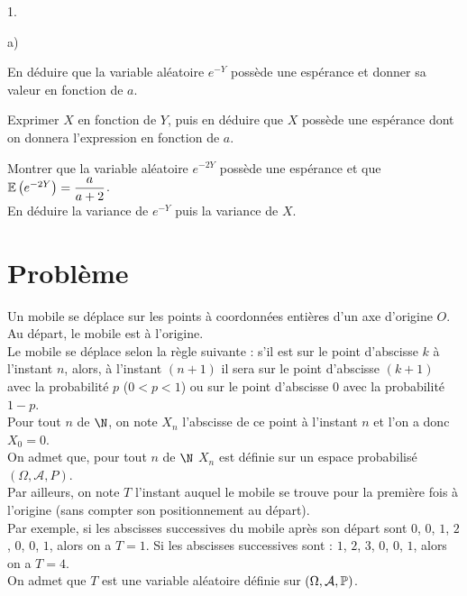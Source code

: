 \documentclass[11pt]{article}%
\begin{document}
\begin{noliste}{1.}
\begin{noliste}{a)}
\item En déduire que la variable aléatoire $e^{-Y}$ possède une
espérance et
donner sa valeur en fonction de $a$.

\item Exprimer $X$ en fonction de $Y$, puis en déduire que $X$ possède
une
espérance dont on donnera l'expression en fonction de $a$.

\item Montrer que la variable aléatoire $e^{-2Y}$ possède une espérance
et
que $\mathbb{E}\left( e^{-2Y}\right) = \dfrac{a}{a + 2}$. \\
En déduire la variance de $e^{-Y}$ puis la variance de $X$.
\end{noliste}
\end{noliste}

\section*{Problème}

Un mobile se déplace sur les points à coordonnées entières d'un axe
d'origine $O.$\\
Au départ, le mobile est à l'origine.\\
Le mobile se déplace selon la règle suivante : s'il est sur le point
d'abscisse $k$ à l'instant $n$, alors, à l'instant $\left( n + 1\right)
$ il
sera sur le point d'abscisse $\left( k + 1\right) $ avec la probabilité
$p$ ($
0<p<1$) ou sur le point d'abscisse $0$ avec la probabilité $1-p$.\\
Pour tout $n$ de $\N$, on note $X_{n}$ l'abscisse de ce point à
l'instant $n$ et l'on a donc $X_{0} = 0$.\\
On admet que, pour tout $n$ de $\N$ $X_{n}$ est définie sur un
espace probabilisé $\left( \Omega,\mathcal{A},P\right) $.\\
Par ailleurs, on note $T$ l'instant auquel le mobile se trouve pour la
première fois à l'origine (sans compter son positionnement au
départ).\\
Par exemple, si les abscisses successives du mobile après son départ
sont $0$, $0$, $1$, $2$, $0$, $0$, $1$, alors on a $T = 1$. Si les
abscisses successives sont : $1$, $2$, $3$, $0$, $0$, $1$, alors on a
$T = 4$.\\
On admet que $T$ est une variable aléatoire définie sur $\left(
\Omega,\mathcal{A},\mathbb{P}\right) $.
\end{document}
